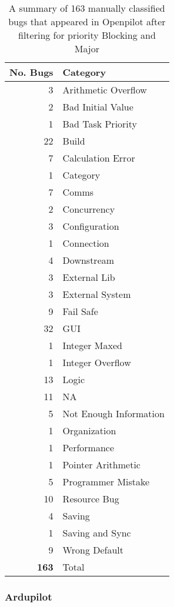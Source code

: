 \begin{table} [h]
  \begin{tabular}{r l}
    No. Bugs & Category \\
    \hline
    3 & Arithmetic Overflow \\
    2 & Bad Initial Value \\
    1 & Bad Task Priority \\
    22 & Build \\
    7 & Calculation Error \\
    1 & Category \\
    7 & Comms \\
    2 & Concurrency \\
    3 & Configuration \\
    1 & Connection \\
    4 & Downstream \\
    3 & External Lib \\
    3 & External System \\
    9 & Fail Safe \\
    32 & GUI \\
    1 & Integer Maxed \\
    1 & Integer Overflow \\ 
    13 & Logic \\
    11 & NA \\
    5 & Not Enough Information \\
    1 & Organization \\
    1 & Performance \\
    1 & Pointer Arithmetic \\
    5 & Programmer Mistake \\
    10 & Resource Bug \\
    4 & Saving \\
    1 & Saving and Sync \\
    9 & Wrong Default \\
    \hline
    \textbf{163} & Total \\
  \end{tabular}
  \caption{A summary of 163 manually classified bugs that appeared in
    Openpilot after filtering for priority Blocking and Major}
  \label{table:opbugs}
\end{table}

\subsubsection{Ardupilot}

